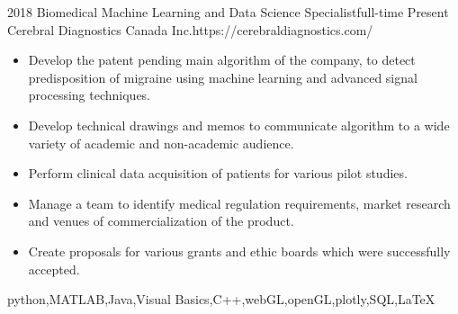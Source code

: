 %
%
%




\begin{experiences}
	
	\myExperience
	{2018}       {Biomedical Machine Learning and Data Science Specialist}{full-time}
	{Present}      {Cerebral Diagnostics Canada Inc.}{https://cerebraldiagnostics.com/}
	{
		\begin{itemize}
			\item Develop the patent pending main algorithm of the company, to detect predisposition of migraine using machine learning and advanced signal processing techniques. 
			\item Develop technical drawings and memos to communicate algorithm to a wide variety of academic and non-academic audience. 
			\item Perform clinical data acquisition of patients for various pilot studies. 
			\item Manage a team to identify medical regulation requirements, market research and venues of commercialization of the product. 
			\item Create proposals for various grants and ethic boards which were successfully accepted.
		\end{itemize}
	}
	{python,MATLAB,Java,Visual Basics,C++,webGL,openGL,plotly,SQL,\LaTeX}
	
	\emptySeparator
	

\end{experiences}
